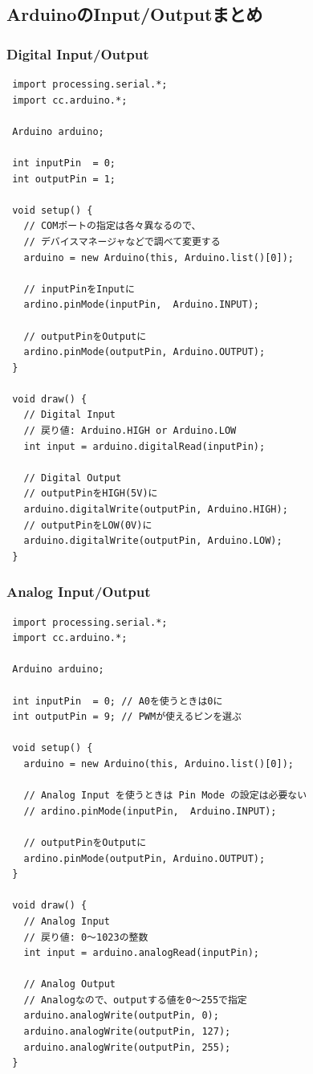 \documentclass[11pt,a4paper]{jarticle}
\begin{document}
\subsection*{ArduinoのInput/Outputまとめ}

\subsubsection*{Digital Input/Output}
\begin{lstlisting}
 import processing.serial.*;
 import cc.arduino.*;

 Arduino arduino;

 int inputPin  = 0;
 int outputPin = 1;

 void setup() {
   // COMポートの指定は各々異なるので、
   // デバイスマネージャなどで調べて変更する
   arduino = new Arduino(this, Arduino.list()[0]);

   // inputPinをInputに
   ardino.pinMode(inputPin,  Arduino.INPUT);

   // outputPinをOutputに 
   ardino.pinMode(outputPin, Arduino.OUTPUT);
 }

 void draw() {
   // Digital Input
   // 戻り値: Arduino.HIGH or Arduino.LOW
   int input = arduino.digitalRead(inputPin);

   // Digital Output
   // outputPinをHIGH(5V)に
   arduino.digitalWrite(outputPin, Arduino.HIGH);
   // outputPinをLOW(0V)に
   arduino.digitalWrite(outputPin, Arduino.LOW);
 } 
\end{lstlisting}


\subsubsection*{Analog Input/Output}
\begin{lstlisting}
 import processing.serial.*;
 import cc.arduino.*;

 Arduino arduino;

 int inputPin  = 0; // A0を使うときは0に
 int outputPin = 9; // PWMが使えるピンを選ぶ 

 void setup() {
   arduino = new Arduino(this, Arduino.list()[0]);

   // Analog Input を使うときは Pin Mode の設定は必要ない
   // ardino.pinMode(inputPin,  Arduino.INPUT);

   // outputPinをOutputに 
   ardino.pinMode(outputPin, Arduino.OUTPUT);
 }

 void draw() {
   // Analog Input
   // 戻り値: 0〜1023の整数
   int input = arduino.analogRead(inputPin);

   // Analog Output
   // Analogなので、outputする値を0〜255で指定
   arduino.analogWrite(outputPin, 0);
   arduino.analogWrite(outputPin, 127);
   arduino.analogWrite(outputPin, 255);
 } 
\end{lstlisting}
\end{document}
